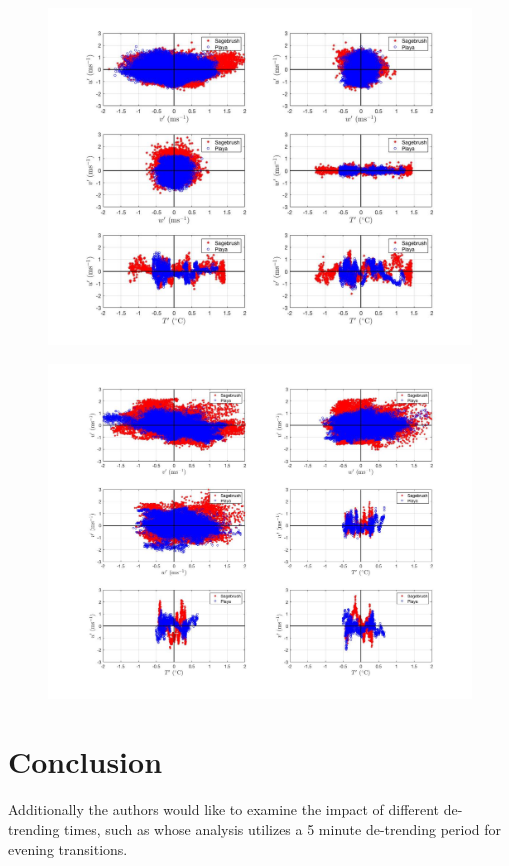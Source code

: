 \documentclass[]{article}
\begin{document}
\begin{figure}
	\centering
	\includegraphics[width=\textwidth]{momentum_corr_05m}
	\caption{}
	\label{fig:mom_05}
\end{figure}
\begin{figure}
	\centering
	\includegraphics[width=\textwidth]{momentum_corr_20m}
	\caption{}
	\label{fig:mom_20}
\end{figure}



\section{Conclusion}
 
 Additionally the authors would like to examine the impact of different de-trending times, such as \cite{} whose analysis utilizes a 5 minute de-trending period for evening transitions. 
\end{document}
